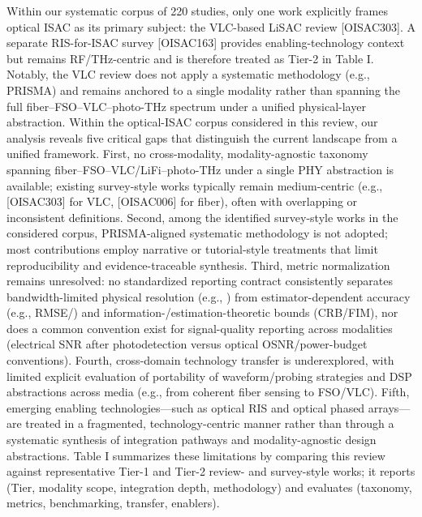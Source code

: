 {} Within our systematic corpus of 220 studies, only one work explicitly frames optical ISAC as its primary subject: the VLC-based LiSAC review [O\markdownRendererUnderscore{}ISAC\markdownRendererUnderscore{}303]. A separate RIS-for-ISAC survey [O\markdownRendererUnderscore{}ISAC\markdownRendererUnderscore{}163] provides enabling-technology context but remains RF/THz-centric and is therefore treated as Tier-2 in Table I. Notably, the VLC review does not apply a systematic methodology (e.g., PRISMA) and remains anchored to a single modality rather than spanning the full fiber–FSO–VLC–photo-THz spectrum under a unified physical-layer abstraction.\markdownRendererParagraphSeparator
{} Within the optical-ISAC corpus considered in this review, our analysis reveals five critical gaps that distinguish the current landscape from a unified framework. First, no cross-modality, modality-agnostic taxonomy spanning fiber–FSO–VLC/LiFi–photo-THz under a single PHY abstraction is available; existing survey-style works typically remain medium-centric (e.g., [O\markdownRendererUnderscore{}ISAC\markdownRendererUnderscore{}303] for VLC, [O\markdownRendererUnderscore{}ISAC\markdownRendererUnderscore{}006] for fiber), often with overlapping or inconsistent definitions. Second, among the identified survey-style works in the considered corpus, PRISMA-aligned systematic methodology is not adopted; most contributions employ narrative or tutorial-style treatments that limit reproducibility and evidence-traceable synthesis. Third, metric normalization remains unresolved: no standardized reporting contract consistently separates bandwidth-limited physical resolution (e.g., ) from estimator-dependent accuracy (e.g., RMSE/) and information-/estimation-theoretic bounds (CRB/FIM), nor does a common convention exist for signal-quality reporting across modalities (electrical SNR after photodetection versus optical OSNR/power-budget conventions). Fourth, cross-domain technology transfer is underexplored, with limited explicit evaluation of portability of waveform/probing strategies and DSP abstractions across media (e.g., from coherent fiber sensing to FSO/VLC). Fifth, emerging enabling technologies—such as optical RIS and optical phased arrays—are treated in a fragmented, technology-centric manner rather than through a systematic synthesis of integration pathways and modality-agnostic design abstractions. Table I summarizes these limitations by comparing this review against representative Tier-1 and Tier-2 review- and survey-style works; it reports  (Tier, modality scope, integration depth, methodology) and evaluates  (taxonomy, metrics, benchmarking, transfer, enablers).\markdownRendererParagraphSeparator
